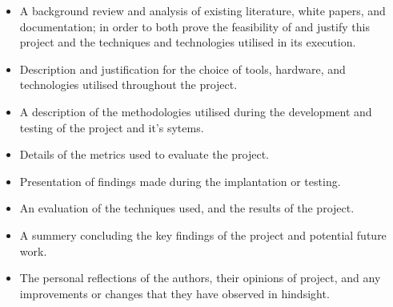 \begin{itemize}

\item A background review and analysis of existing literature, white papers, and
documentation; in order to both prove the feasibility of and justify this
project and the techniques and technologies utilised in its execution.

\item Description and justification for the choice of tools, hardware, and
technologies utilised throughout the project.

\item A description of the methodologies utilised during the
development and testing of the project and it's sytems.

\item Details of the metrics used to evaluate the project.

\item Presentation of findings made during the implantation or testing.

\item An evaluation of the techniques used, and the results of the project.

\item A summery concluding the key findings of the project and potential future
work.

\item The personal reflections of the authors, their opinions of project, and any
improvements or changes that they have observed in hindsight.

\end{itemize}
